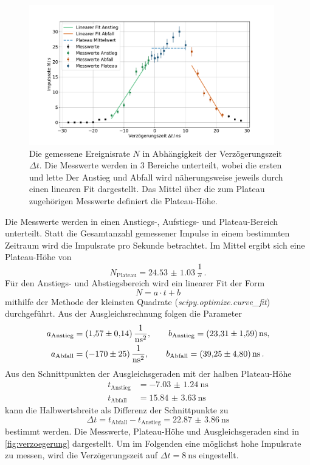 \begin{figure}
    \centering
    \includegraphics[width=0.95\textwidth]{content/plots/verzoegerungszeit.pdf}
    \caption{Die gemessene Ereignisrate $N$ in Abhängigkeit der Verzögerungszeit $\Delta t$.
    Die Messwerte werden in 3 Bereiche unterteilt, wobei die ersten und lette
    Der Anstieg und Abfall wird näherungsweise jeweils durch einen linearen Fit dargestellt.
    Das Mittel über die zum Plateau zugehörigen Messwerte definiert die Plateau-Höhe.}
    \label{fig:verzoegerung}
\end{figure}
Die Messwerte werden in einen Anstiegs-, Aufstiegs- und Plateau-Bereich unterteilt.
Statt die Gesamtanzahl gemessener Impulse in einem bestimmten Zeitraum wird die Impulsrate pro Sekunde betrachtet.
Im Mittel ergibt sich eine Plateau-Höhe von
\begin{equation}
    N_\text{Plateau} = \qty{24.53(103)}{\frac{1}{\second}} \,.
\end{equation}
Für den Anstiegs- und Abstiegsbereich wird ein linearer Fit der Form
\begin{equation*}
    N = a \cdot t + b
\end{equation*}
mithilfe der Methode der kleinsten Quadrate (\textit{scipy.optimize.curve\_fit}\cite{scipy}) durchgeführt.
Aus der Ausgleichsrechnung folgen die Parameter
\begin{align*}
    a_\text{Anstieg} &= \qty{1.57(14)}{\frac{1}{\nano\second^2}},\qquad b_\text{Anstieg} = \qty{23.31(159)}{\nano\second}, \\
    a_\text{Abfall} &= \qty{-170(25)}{\frac{1}{\nano\second^2}},\qquad b_\text{Abfall} = \qty{39.25(480)}{\nano\second} \,.
\end{align*}
Aus den Schnittpunkten der Ausgleichsgeraden mit der halben Plateau-Höhe
\begin{align*}
    t_\text{Anstieg} &= \qty{-7.03(124)}{\nano\second} \\
    t_\text{Abfall} &= \qty{15.84(363)}{\nano\second}
\end{align*}
kann die Halbwertsbreite als Differenz der Schnittpunkte zu
\begin{equation}
    \Delta t = t_\text{Abfall} - t_\text{Anstieg} = \qty{22.87(386)}{\nano\second}
\end{equation}
bestimmt werden.
Die Messwerte, Plateau-Höhe und Ausgleichsgeraden sind in \autoref{fig:verzoegerung} dargestellt.
Um im Folgenden eine möglichst hohe Impulsrate zu messen, wird die Verzögerungszeit auf $\Delta t = \qty{8}{\nano\second}$ eingestellt.%
\FloatBarrier

